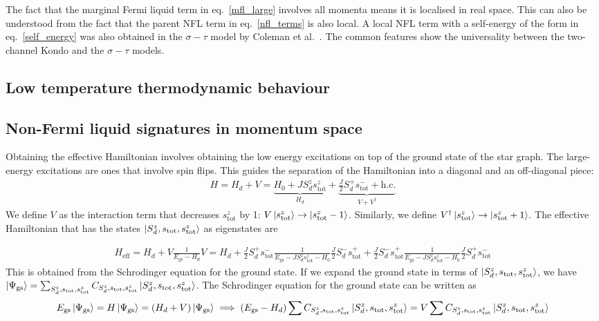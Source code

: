 \documentclass[reprint,prb,superscriptaddress]{revtex4-2}
\begin{document}
The fact that the marginal Fermi liquid term in eq.~\ref{mfl_large} involves all momenta means it is localised in real space. This can also be understood from the fact that the parent NFL term in eq.~\ref{nfl_terms} is also local. A local NFL term with a self-energy of the form in eq.~\ref{self_energy} was also obtained in the \(\sigma-\tau\) model by Coleman et al.~\cite{Coleman_tsvelik}. The common features show the universality between the two-channel Kondo and the \(\sigma-\tau\) models.
\subsection{Low temperature thermodynamic behaviour}

\subsection{Non-Fermi liquid signatures in momentum space}
Obtaining the effective Hamiltonian involves obtaining the low energy excitations on top of the ground state of the star graph. The large-energy excitations are ones that involve spin flips. This guides the separation of the Hamiltonian into a diagonal and an off-diagonal piece:
\begin{align}
	H = H_d + V = \underbrace{H_0 + J S_d^z s_\text{tot}^z}_{H_d} + \underbrace{\frac{J}{2}S_d^+ s_\text{tot}^- + \text{h.c.}}_{V + V^\dagger}
\end{align}
We define \(V\) as the interaction term that decreases \(s_\text{tot}^z\) by 1: \(V \ket{s_\text{tot}^z} \to \ket{s_\text{tot}^z - 1}\). Similarly, we define \(V^\dagger \ket{s_\text{tot}^z} \to \ket{s_\text{tot}^z + 1}\). The effective Hamiltonian that has the states \(\ket{S_d^z, s_\text{tot}, s_\text{tot}^z}\) as eigenstates are
\begin{widetext}
\begin{align}
	H_\text{eff} = H_d + V \frac{1}{E_\text{gs} - H_d}V = H_d + \frac{J}{2}S_d^+ s_\text{tot}^- \frac{1}{E_\text{gs} - J S_d^z s_\text{tot}^z - H_0}\frac{J}{2}S_d^- s_\text{tot}^+ +\frac{J}{2}S_d^- s_\text{tot}^+ \frac{1}{E_\text{gs} - J S_d^z s_\text{tot}^z - H_0}\frac{J}{2}S_d^+ s_\text{tot}^-
\end{align}
This is obtained from the Schrodinger equation for the ground state. If we expand the ground state in terms of \(\ket{S_d^z, s_\text{tot}, s_\text{tot}^z}\), we have  \(\ket{\Psi_\text{gs}} = \sum_{S_d^z, s_\text{tot},s_\text{tot}^z}C_{S_d^z, s_\text{tot},s_\text{tot}^z}\ket{S_d^z, s_\text{tot}, s_\text{tot}^z}\). The Schrodinger equation for the ground state can be written as
\begin{align}
	E_\text{gs}\ket{\Psi_\text{gs}} = H \ket{\Psi_\text{gs}} = \left(H_d + V\right)\ket{\Psi_\text{gs}} \implies \left(E_\text{gs} - H_d\right)\sum C_{S_d^z, s_\text{tot},s_\text{tot}^z}\ket{S_d^z, s_\text{tot}, s_\text{tot}^z} = V\sum C_{S_d^z, s_\text{tot},s_\text{tot}^z}\ket{S_d^z, s_\text{tot}, s_\text{tot}^z}
\end{align}
\end{widetext}
\end{document}
